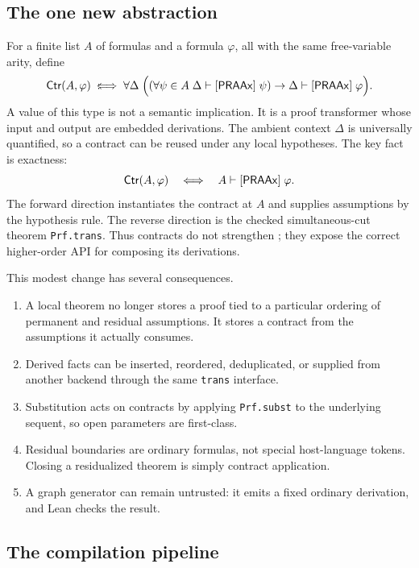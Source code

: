 \subsection{The one new abstraction}

For a finite list \(A\) of formulas and a formula \(\varphi\), all with the same free-variable arity, define
\[
 \mathsf{Ctr}(A,\varphi)
 \;:\!\!\Longleftrightarrow\;
 \forall\Delta\;\Bigl(
   (\forall\psi\in A\;\Delta\mathrel{\vdash[\mathsf{PRAAx}]}\psi)
   \to \Delta\mathrel{\vdash[\mathsf{PRAAx}]}\varphi\Bigr).
\]
A value of this type is not a semantic implication.  It is a proof transformer whose input and output are embedded derivations.  The ambient context \(\Delta\) is universally quantified, so a contract can be reused under any local hypotheses.  The key fact is exactness:
\[
                       \mathsf{Ctr}(A,\varphi)
                       \quad\Longleftrightarrow\quad
                       A\mathrel{\vdash[\mathsf{PRAAx}]}\varphi.
\]
The forward direction instantiates the contract at \(A\) and supplies assumptions by the hypothesis rule.  The reverse direction is the checked simultaneous-cut theorem \texttt{Prf.trans}.  Thus contracts do not strengthen \iPRA; they expose the correct higher-order API for composing its derivations.

This modest change has several consequences.
\begin{enumerate}[label=(\arabic*)]
  \item A local theorem no longer stores a proof tied to a particular ordering of permanent and residual assumptions.  It stores a contract from the assumptions it actually consumes.
  \item Derived facts can be inserted, reordered, deduplicated, or supplied from another backend through the same \texttt{trans} interface.
  \item Substitution acts on contracts by applying \texttt{Prf.subst} to the underlying sequent, so open parameters are first-class.
  \item Residual boundaries are ordinary formulas, not special host-language tokens.  Closing a residualized theorem is simply contract application.
  \item A graph generator can remain untrusted: it emits a fixed ordinary derivation, and Lean checks the result.
\end{enumerate}

\subsection{The compilation pipeline}

